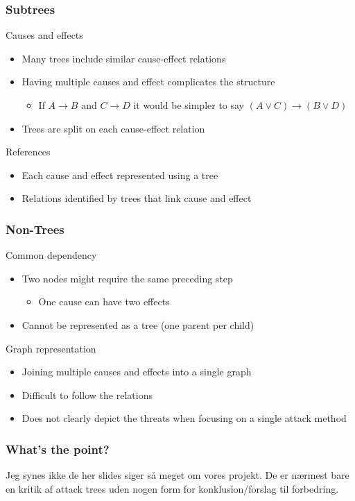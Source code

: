 \begin{frame}\frametitle{Subtrees}
  \begin{block}{Causes and effects}
    \begin{itemize}
      \item Many trees include similar cause-effect relations
      \item Having multiple causes and effect complicates the structure
      \begin{itemize}
        \item If $A \rightarrow B$ and $C \rightarrow D$ it would be simpler to say $(A \vee C) \rightarrow (B \vee D)$
      \end{itemize}
      \item Trees are split on each cause-effect relation
    \end{itemize}
  \end{block}
  \begin{block}{References}
    \begin{itemize}
      \item Each cause and effect represented using a tree
      \item Relations identified by trees that link cause and effect
    \end{itemize}
  \end{block}
\end{frame}



\begin{frame}\frametitle{Non-Trees}
  \begin{block}{Common dependency}
    \begin{itemize}
      \item Two nodes might require the same preceding step
      \begin{itemize}
        \item One cause can have two effects
      \end{itemize}
      \item Cannot be represented as a tree (one parent per child)
    \end{itemize}
  \end{block}
  \begin{block}{Graph representation}
    \begin{itemize}
      \item Joining multiple causes and effects into a single graph
      \item Difficult to follow the relations
      \item Does not clearly depict the threats when focusing on a single attack method
    \end{itemize}
  \end{block}
\end{frame}

\begin{frame}\frametitle{What's the point?}
  Jeg synes ikke de her slides siger så meget om vores projekt.
  De er nærmest bare en kritik af attack trees uden nogen form for konklusion/forslag til forbedring.
\end{frame}
